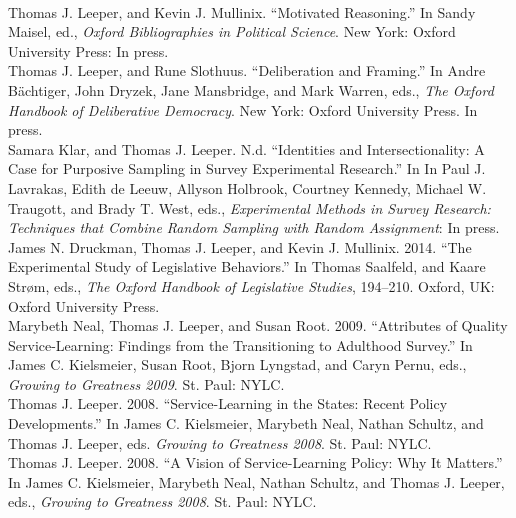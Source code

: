 \documentclass[12pt]{article}
\newcommand{\topic}[1]{\pagebreak[3]\indent {\color{lg}{\footnotesize #1 }}\\}
\newcommand{\entry}[1]{\indent {\color{lg}\guillemotright}\hspace{2pt}#1\vspace{.25em}\\}
\begin{document}
\topic{Chapters in Edited Volumes}
    \entry{Thomas J. Leeper, and Kevin J. Mullinix. ``Motivated Reasoning.'' In Sandy Maisel, ed., \textit{Oxford Bibliographies in Political Science}. New York: Oxford University Press: In press.}
    \entry{Thomas J. Leeper, and Rune Slothuus. ``Deliberation and Framing.'' In Andre B{\"a}chtiger, John Dryzek, Jane Mansbridge, and Mark Warren, eds., \textit{The Oxford Handbook of Deliberative Democracy}. New York: Oxford University Press. In press.}
	\entry{Samara Klar, and Thomas J. Leeper. N.d. ``Identities and Intersectionality: A Case for Purposive Sampling in Survey Experimental Research.'' In  In Paul J. Lavrakas, Edith de Leeuw, Allyson Holbrook, Courtney Kennedy, Michael W. Traugott, and Brady T. West, eds., \textit{Experimental Methods in Survey Research: Techniques that Combine Random Sampling with Random Assignment}: In press.}
    \entry{James N. Druckman, Thomas J. Leeper, and Kevin J. Mullinix. 2014. ``The Experimental Study of Legislative Behaviors.'' In Thomas Saalfeld, and Kaare Str\o m, eds., \textit{The Oxford Handbook of Legislative Studies}, 194--210. Oxford, UK: Oxford University Press.}
	\entry{Marybeth Neal, Thomas J. Leeper, and Susan Root. 2009. ``Attributes of Quality Service-Learning: Findings from the Transitioning to Adulthood Survey.'' In James C. Kielsmeier, Susan Root, Bjorn Lyngstad, and Caryn Pernu, eds., \textit{Growing to Greatness 2009}. St. Paul: NYLC.}
	\entry{Thomas J. Leeper. 2008. ``Service-Learning in the States: Recent Policy Developments.'' In James C. Kielsmeier, Marybeth Neal, Nathan Schultz, and Thomas J. Leeper, eds. \textit{Growing to Greatness 2008}. St. Paul: NYLC.}
	\entry{Thomas J. Leeper. 2008. ``A Vision of Service-Learning Policy: Why It Matters.'' In James C. Kielsmeier, Marybeth Neal, Nathan Schultz, and Thomas J. Leeper, eds., \textit{Growing to Greatness 2008}. St. Paul: NYLC.}
\end{document}
